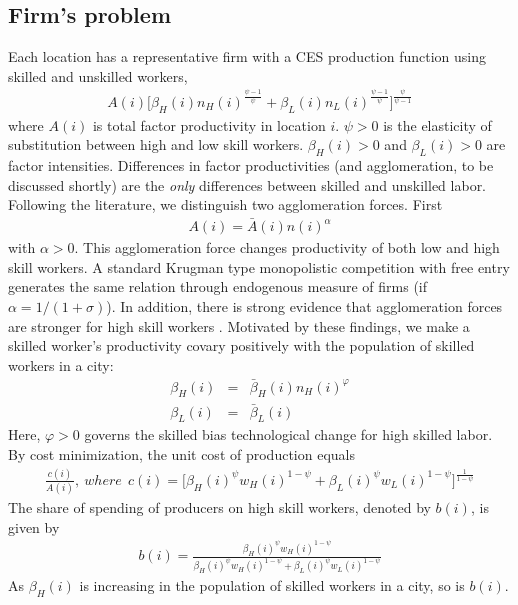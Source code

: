 \documentclass[12 pt]{article}
\begin{document}
\subsection{Firm's problem}
Each location has a representative firm with a CES production function using skilled and unskilled workers,
\begin{eqnarray}
	 A(i)\Big[ \beta_H(i) n_H(i)^{\frac{\psi-1}{\psi}} + \beta_L(i) n_L(i)^{\frac{\psi-1}{\psi}} \Big]^{\frac{\psi}{\psi-1}} \nonumber
\end{eqnarray}
where $A(i)$ is total factor productivity in location $i$. $\psi>0$ is the elasticity of substitution between high and low skill workers. $\beta_H(i)>0$ and $\beta_L(i)>0$ are factor intensities. Differences in factor productivities (and agglomeration, to be discussed shortly) are the \textit{only} differences between skilled and unskilled labor. 
Following the literature, we distinguish two agglomeration forces. First 
\begin{eqnarray}\label{eq:agglom_general}
A(i) = \bar{A}(i) n(i)^{\alpha}
\end{eqnarray}
with $\alpha>0$. This agglomeration force changes productivity of both low and high skill workers. A standard Krugman type monopolistic competition with free entry generates the same relation through endogenous measure of firms (if $\alpha=1/(1+\sigma)$). In addition, there is strong evidence that agglomeration forces are stronger for high skill workers \citep{glaeser2010complementarity}.  Motivated by these findings, we make a skilled worker's productivity covary positively with the population of skilled workers in a city:
\begin{eqnarray}\label{eq:agglom_specific}
	\beta_H(i) & = & \bar{\beta}_H(i) n_H(i)^{\varphi} \nonumber \\
	\beta_L(i) & = & \bar{\beta}_L(i)
\end{eqnarray}
Here, $\varphi>0$ governs the skilled bias technological change for high skilled labor.
By cost minimization, the unit cost of production equals
\begin{eqnarray}\label{eq:unit_cost}
	 \frac{c(i)}{A(i)} ,~where~~c(i)=\Big[ \beta_H(i)^{\psi} w_H(i)^{1-\psi} + \beta_L(i)^{\psi} w_L(i)^{1-\psi}\Big]^{\frac{1}{1-\psi}}
\end{eqnarray}
The share of spending of producers on high skill workers, denoted by $b(i)$, is given by
\begin{eqnarray}\label{eq:input_share}
	b(i) = \frac{\beta_H(i)^{\psi} w_H(i)^{1-\psi}}{\beta_H(i)^{\psi} w_H(i)^{1-\psi} + \beta_L(i)^{\psi} w_L(i)^{1-\psi}}
\end{eqnarray}
As $\beta_H(i)$ is increasing in the population of skilled workers in a city, so is $b(i)$.
\end{document}

